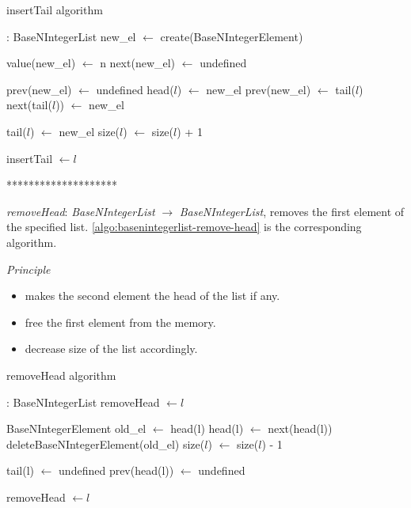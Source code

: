 \documentclass[book, nodocumentinfo]{upmethodology-document}
\newcommand{\separator}{\centerline{********************}}
\begin{document}
\begin{algorithm}[H]
    \caption{insertTail algorithm}
    \label{algo:basenintegerlist-insert-tail}

    \begin{algorithmic}
         : BaseNIntegerList
            \State new\_el \(\leftarrow\) create(BaseNIntegerElement)

            \State value(new\_el) \(\leftarrow\) n
            \State next(new\_el) \(\leftarrow\) undefined

                \State prev(new\_el) \(\leftarrow\) undefined
                \State head(\(l\)) \(\leftarrow\) new\_el
            \Else
                \State prev(new\_el) \(\leftarrow\) tail(\(l\))
                \State next(tail(\(l\))) \(\leftarrow\) new\_el
            \EndIf

            \State tail(\(l\)) \(\leftarrow\) new\_el
            \State size(\(l\)) \(\leftarrow\) size(\(l\)) + 1

            \State insertTail \(\leftarrow l\)
        \EndFunction
    \end{algorithmic}
\end{algorithm}

\separator

\emph{removeHead}: \emph{BaseNIntegerList} \(\rightarrow\) \emph{BaseNIntegerList},
removes the first element of the specified list.
\ref{algo:basenintegerlist-remove-head} is the corresponding algorithm.

\emph{Principle}
\begin{itemize}
    \item makes the second element the head of the list if any.
    \item free the first element from the memory.
    \item decrease size of the list accordingly.
\end{itemize}

\begin{algorithm}[H]
    \caption{removeHead algorithm}
    \label{algo:basenintegerlist-remove-head}

    \begin{algorithmic}
         : BaseNIntegerList
                \State removeHead \(\leftarrow l\)
            \EndIf

            \State BaseNIntegerElement old\_el \(\leftarrow\) head(l)
            \State head(l) \(\leftarrow\) next(head(l))
            \State deleteBaseNIntegerElement(old\_el)
            \State size(\(l\)) \(\leftarrow\) size(\(l\)) - 1

                \State tail(l) \(\leftarrow\) undefined
            \Else
                \State prev(head(l)) \(\leftarrow\) undefined
            \EndIf

            \State removeHead \(\leftarrow l\)
        \EndFunction
    \end{algorithmic}
\end{algorithm}
\end{document}
